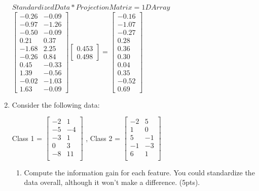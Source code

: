 \documentclass[12pt]{article}
\begin{document}
\begin{enumerate}
$StandardizedData * ProjectionMatrix = 1DArray$ \\
\hfill \break
$\begin{bmatrix}
  -0.26 & -0.09 \\
  -0.97 & -1.26 \\
  -0.50 & -0.09 \\
   0.21 &  0.37 \\
  -1.68 &  2.25 \\
  -0.26 &  0.84 \\
   0.45 & -0.33 \\
   1.39 & -0.56 \\
  -0.02 & -1.03 \\
   1.63 & -0.09
\end{bmatrix}
\begin{bmatrix}
	0.453 \\
    0.498
\end{bmatrix}
=
\begin{bmatrix}
	-0.16\\
    -1.07\\
    -0.27\\
     0.28\\
     0.36\\
     0.30\\
     0.04\\
     0.35\\
    -0.52\\
     0.69
\end{bmatrix}
$


\newpage
\item Consider the following data:\\
\begin{center}
Class 1 = 
$
 \begin{bmatrix}
	-2 & 1\\
	-5 & -4\\	
	-3 & 1\\
	0 & 3\\
	-8 & 11\\
	
\end{bmatrix}
$
, Class 2 = 
$
 \begin{bmatrix}
	-2 & 5\\
	1 & 0\\
	5 & -1\\
	-1 & -3\\
	6 & 1\\
\end{bmatrix}
$
\end{center}
	\begin{enumerate}
	\item Compute the information gain for each feature.  You could standardize the data overall, although it won't make a difference. (5pts).
	\hfill \break


\end{enumerate}
\end{enumerate}
\end{document}

